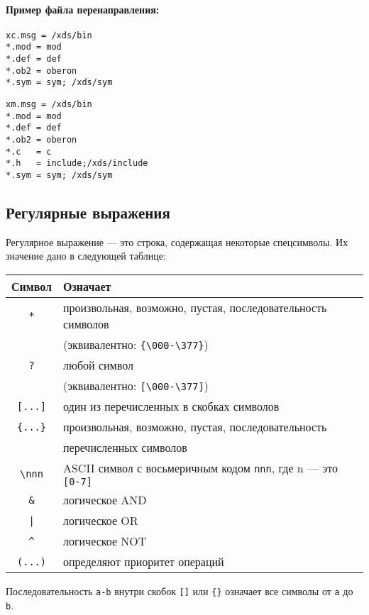 \paragraph{Пример файла перенаправления:}
\ifgencode
\begin{verbatim}
xc.msg = /xds/bin
*.mod = mod
*.def = def
*.ob2 = oberon
*.sym = sym; /xds/sym
\end{verbatim}
\else %
\begin{verbatim}
xm.msg = /xds/bin
*.mod = mod
*.def = def
*.ob2 = oberon
*.c   = c
*.h   = include;/xds/include
*.sym = sym; /xds/sym
\end{verbatim}
\fi %

\subsection{Регулярные выражения}\label{xc:regexpr}

Регулярное выражение --- это строка, содержащая некоторые спецсимволы.
Их значение дано в следующей таблице:

\begin{center}
\begin{tabular}{cl}
\bf Символ   & \bf Означает \\
\hline
\verb+*+     & произвольная, возможно, пустая, последовательность символов \\
             & (эквивалентно: \verb|{\000-\377}|) \\
\verb+?+     & любой символ \\
             & (эквивалентно: \verb|[\000-\377]|) \\
\verb+[...]+ & один из перечисленных в скобках символов\\
\verb+{...}+ & произвольная, возможно, пустая, последовательность \\
             & перечисленных символов \\
\verb+\nnn+  & ASCII символ с восьмеричным кодом \verb|nnn|, где n --- это \verb|[0-7]| \\
\verb+&+     & логическое AND \\
\verb+|+     & логическое OR  \\
\verb+^+     & логическое NOT \\
\verb+(...)+ & определяют приоритет операций
\end{tabular}
\end{center}

Последовательность \verb|a-b| внутри скобок
\verb|[]| или \verb|{}| означает все символы от \verb|a| до \verb|b|.

